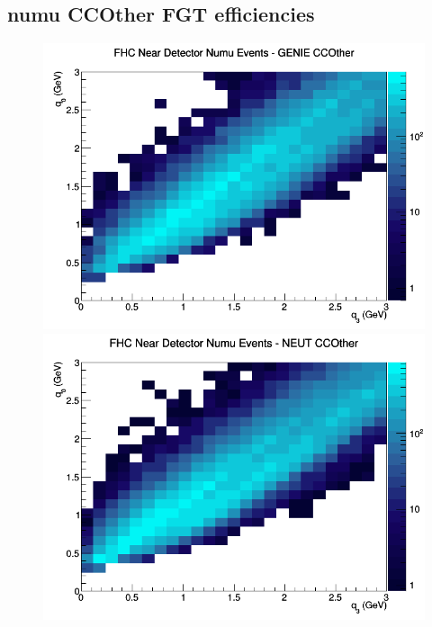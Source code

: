 \documentclass[12pt]{article}
\begin{document}
\subsection{numu CCOther FGT efficiencies}
\begin{figure}[h]
\includegraphics[width=\linewidth]{eff_q0_q3/FGT/CCOther_FHC_ND_numu_q3_q0_GENIE.png}
\endminipage
{}
\includegraphics[width=\linewidth]{eff_q0_q3/FGT/CCOther_FHC_ND_numu_q3_q0_NEUT.png}
\endminipage
{}

\end{figure}
\end{document}
